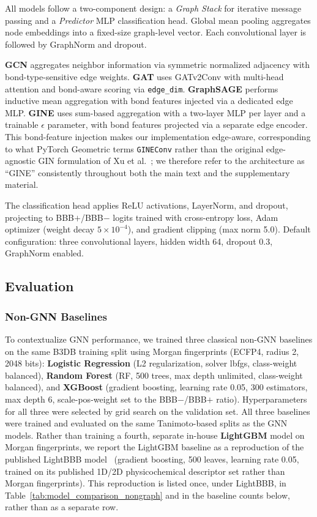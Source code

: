 \documentclass[conference]{IEEEtran}
\begin{document}
All models follow a two-component design: a \emph{Graph Stack} for
iterative message passing and a \emph{Predictor} MLP classification
head. Global mean pooling aggregates node embeddings into a
fixed-size graph-level vector. Each convolutional layer is followed by
GraphNorm and dropout.

\textbf{GCN} aggregates neighbor information via symmetric normalized
adjacency with bond-type-sensitive edge weights. \textbf{GAT} uses
GATv2Conv with multi-head attention and bond-aware scoring via
\texttt{edge\_dim}. \textbf{GraphSAGE} performs inductive mean
aggregation with bond features injected via a dedicated edge MLP.
\textbf{GINE} uses sum-based aggregation with a two-layer MLP per
layer and a trainable $\epsilon$ parameter, with bond features
projected via a separate edge encoder. This bond-feature injection
makes our implementation edge-aware, corresponding to what PyTorch
Geometric terms \texttt{GINEConv} rather than the original
edge-agnostic GIN formulation of Xu et al.~\cite{Xu2019gin}; we
therefore refer to the architecture as ``GINE'' consistently throughout
both the main text and the supplementary material.

The classification head applies ReLU activations, LayerNorm, and
dropout, projecting to BBB$+$/BBB$-$ logits trained with
cross-entropy loss, Adam optimizer (weight decay $5\times10^{-4}$),
and gradient clipping (max norm 5.0). Default configuration: three
convolutional layers, hidden width 64, dropout 0.3, GraphNorm
enabled.

\subsection{Evaluation}
\label{sec:evaluation}

\subsubsection{Non-GNN Baselines}

To contextualize GNN performance, we trained three classical non-GNN
baselines on the same B3DB training split using Morgan fingerprints
(ECFP4, radius 2, 2048 bits): \textbf{Logistic Regression} (L2
regularization, solver lbfgs, class-weight balanced),
\textbf{Random Forest} (RF, 500 trees, max depth unlimited,
class-weight balanced), and \textbf{XGBoost} (gradient boosting, learning
rate 0.05, 300 estimators, max depth 6, scale-pos-weight set to the
BBB$-$/BBB$+$ ratio). Hyperparameters for all three were selected
by grid search on the validation set. All three baselines were trained
and evaluated on the same Tanimoto-based splits as the GNN models.
Rather than training a fourth, separate in-house \textbf{LightGBM}
model on Morgan fingerprints, we report the LightGBM baseline as a
reproduction of the published LightBBB model~\cite{Shaker2021}
(gradient boosting, 500 leaves, learning rate 0.05, trained on its
published 1D/2D physicochemical descriptor set rather than Morgan
fingerprints). This reproduction is listed once, under LightBBB, in
Table~\ref{tab:model_comparison_nongraph} and in the baseline counts below,
rather than as a separate row.
\end{document}
